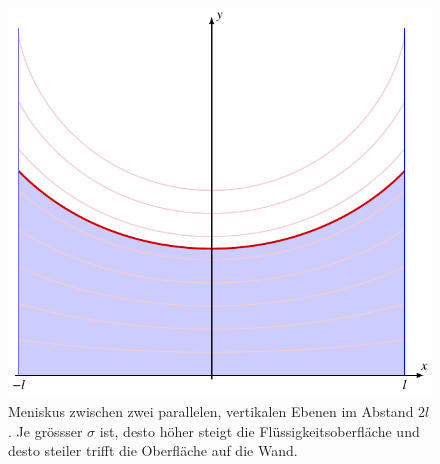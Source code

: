 %
%
%
\begin{figure}
\centering
\includegraphics{chapters/050-nebenbedingungen/images/meniskus.pdf}
\caption{Meniskus zwischen zwei parallelen, vertikalen Ebenen
im Abstand $2l$.
Je grössser $\sigma$ ist, desto höher steigt die Flüssigkeitsoberfläche
und desto steiler trifft die Oberfläche auf die Wand.
\label{buch:nebenbedingungen:transversal:fig:meniskus}}
\end{figure}
